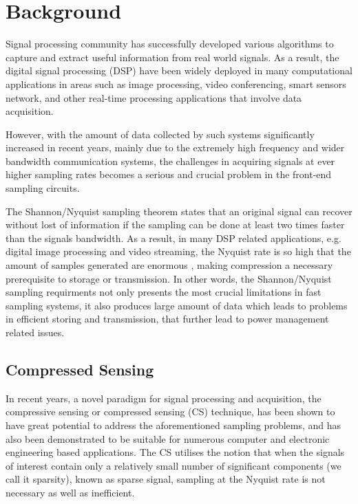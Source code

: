 \section{Background}

Signal processing community has successfully developed various
algorithms to capture and extract useful information from real world signals. As a result, the digital signal processing (DSP) have been widely deployed in many computational applications in areas such as image processing, video conferencing, smart sensors network, and other real-time processing applications that involve data acquisition.

However, with the amount of data collected
by such systems significantly increased in recent years, mainly due to the extremely high frequency and wider bandwidth communication systems, the challenges in acquiring signals at ever higher sampling rates becomes a serious and crucial problem in the front-end sampling circuits.

The Shannon/Nyquist sampling theorem \cite{wyner1998introduction} states that an original signal can recover without lost of information if the sampling can be done at least two times faster than the signals
bandwidth. As a result, in many DSP related
applications, e.g. digital image processing and video streaming, the Nyquist rate is so high that the amount of  samples generated are enormous , making compression a necessary prerequisite to storage or transmission.
In other words, the Shannon/Nyquist sampling requirments not only presents the most crucial limitations in fast sampling systems, it also produces large amount of data which leads to problems in efficient storing and transmission, that further lead to power management related issues.

\subsection{Compressed Sensing}

In recent years, a novel paradigm for signal processing and acquisition, the compressive sensing or compressed sensing (CS) technique, has been shown to have great potential to address the aforementioned sampling problems, and has also been demonstrated to be suitable for numerous computer and electronic engineering based applications. The CS utilises the notion that when the signals of interest contain only a relatively small number of significant components (we call it sparsity), known as sparse signal, sampling at the Nyquist rate is not necessary as well as inefficient. 

